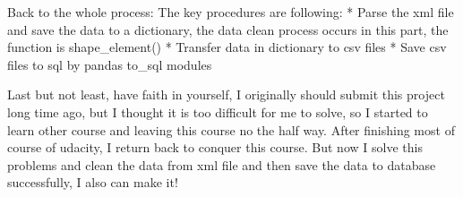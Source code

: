 \documentclass[11pt]{article}
\begin{document}
Back to the whole process: The key procedures are following: * Parse the
xml file and save the data to a dictionary, the data clean process
occurs in this part, the function is shape\_element() * Transfer data in
dictionary to csv files * Save csv files to sql by pandas to\_sql
modules

 Last but not least, have faith in yourself, I originally should submit
this project long time ago, but I thought it is too difficult for me to
solve, so I started to learn other course and leaving this course no the
half way. After finishing most of course of udacity, I return back to
conquer this course. But now I solve this problems and clean the data
from xml file and then save the data to database successfully, I also
can make it!


    
    
    
    
\end{document}
